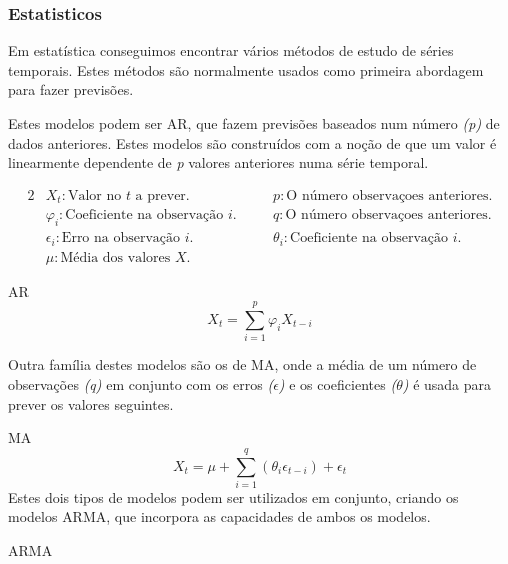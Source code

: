 \subsubsection{Estatisticos}

Em estatística conseguimos encontrar vários métodos de estudo de séries temporais. Estes métodos são normalmente usados como primeira abordagem para fazer previsões.\par
Estes modelos podem ser \gls{AR}, que fazem previsões baseados num número \textit{(p)} de dados anteriores. Estes modelos são construídos com a noção de que um valor é linearmente dependente de \textit{p} valores anteriores numa série temporal.\par

\begin{alignat*}{2} 
    & X_{t} : \text{Valor no } t \text{ a prever.} &\quad& p : \text{O número observaçoes anteriores.} \\
    & \varphi_{i} : \text{Coeficiente na observação } i. &\quad& q : \text{O número observaçoes anteriores.} \\
    & \epsilon_{i} : \text{Erro na observação } i. &\quad& \theta_{i} : \text{Coeficiente na observação } i \text{.} \\ 
    & \mu : \text{Média dos valores } X \text{.} 
\end{alignat*}

\bigskip
\gls{AR} \\

\begin{equation} \label{eq:ar} 
    X_{t} = \sum_{i=1}^{p}\varphi_{i} X_{t-i} 
\end{equation}
\smallskip

Outra família destes modelos são os de \gls{MA}, onde a média de um número de observações \textit{(q)} em conjunto com os erros \textit{($\epsilon$)} e os coeficientes \textit{($\theta$)} é usada para prever os valores seguintes.\par
\bigskip
\gls{MA} \\

\begin{equation} \label{eq:ma} 
    X_{t} = \mu + \sum_{i=1}^{q}(\theta_{i} \epsilon_{t-i}) + \epsilon_{t}
\end{equation}
\smallskip
Estes dois tipos de modelos podem ser utilizados em conjunto, criando os modelos \gls{ARMA}, que incorpora as capacidades de ambos os modelos.\par

\bigskip
\gls{ARMA} \\

